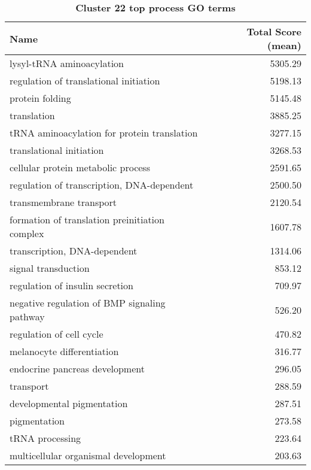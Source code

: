 \begin{table}[hp]
\begin{center} \sf
\begin{tabular}{p{}r}
\toprule
\textbf{Name}                                  & \textbf{Total Score (mean)} \\ \midrule
lysyl-tRNA aminoacylation                      & 5305.29                     \\
regulation of translational initiation         & 5198.13                     \\
protein folding                                & 5145.48                     \\
translation                                    & 3885.25                     \\
tRNA aminoacylation for protein translation    & 3277.15                     \\
translational initiation                       & 3268.53                     \\
cellular protein metabolic process             & 2591.65                     \\
regulation of transcription, DNA-dependent     & 2500.50                     \\
transmembrane transport                        & 2120.54                     \\
formation of translation preinitiation complex & 1607.78                     \\
transcription, DNA-dependent                   & 1314.06                     \\
signal transduction                            & 853.12                      \\
regulation of insulin secretion                & 709.97                      \\
negative regulation of BMP signaling pathway   & 526.20                      \\
regulation of cell cycle                       & 470.82                      \\
melanocyte differentiation                     & 316.77                      \\
endocrine pancreas development                 & 296.05                      \\
transport                                      & 288.59                      \\
developmental pigmentation                     & 287.51                      \\
pigmentation                                   & 273.58                      \\
tRNA processing                                & 223.64                      \\
multicellular organismal development           & 203.63                      \\ \bottomrule
\end{tabular}
\end{center}

\caption[Cluster 22 top process GO terms]{\sf \textbf{Cluster 22 top process GO terms}}
\label{tab:cls22-process}
\end{table}